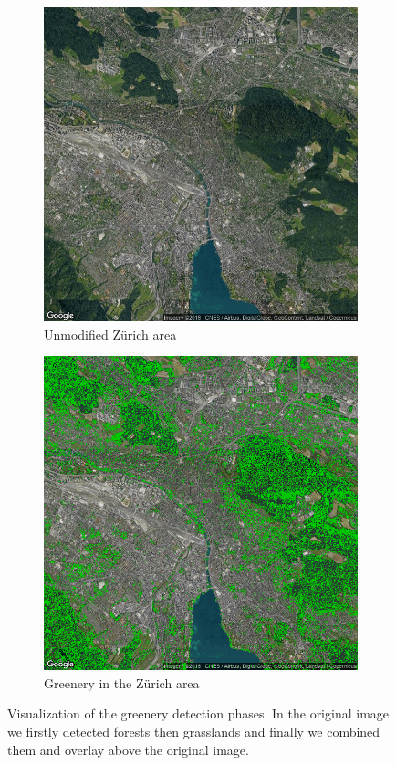 \documentclass[letterpaper]{article}
\begin{document}
\begin{figure}
    \begin{subfigure}{.22\textwidth}
        \centering
        \includegraphics[width=.95\linewidth]{../images/greenery/Zurich.png}
        \caption[width=.2\textwidth]{Unmodified Zürich area}
    \end{subfigure}%
    \begin{subfigure}{.22\textwidth}
        \centering
        \includegraphics[width=.95\linewidth]{../images/greenery/Zurich_greenery.png}
        \caption[width=.2\textwidth]{Greenery in the Zürich area}
    \end{subfigure}
    \caption{Visualization of the greenery detection phases. In the original image we firstly detected forests then 
             grasslands and finally we combined them and overlay above the original image.}
    \label{fig:ZurichGreenery}
\end{figure}
\end{document}
